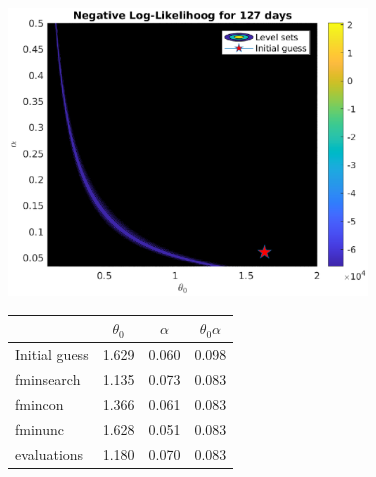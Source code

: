 \documentclass[aspectratio=169]{beamer}\usepackage[utf8]{inputenc}
\begin{document}
\begin{frame}
\begin{columns}
\begin{figure}[ht!]
\centering
\includegraphics[width=0.85\textwidth]{../../MATLAB_Files/Results/likelihood/normal/Log-Likelihood.eps}\\
{\tiny
\begin{table}[]
\begin{tabular}{lccc}
\toprule
 & $\theta_0$ & $\alpha$ & $\theta_0\alpha$\\
 \midrule
 Initial guess & 1.629 & 0.060 & 0.098 \\
 fminsearch & 1.135 & 0.073 & 0.083 \\
 fmincon & 1.366 & 0.061 & 0.083 \\
 fminunc & 1.628 & 0.051 & 0.083 \\
 evaluations & 1.180 & 0.070 & 0.083 \\
 \bottomrule
\end{tabular}
\end{table}
}
\end{figure}

\end{columns}

\end{frame}

\end{document}
